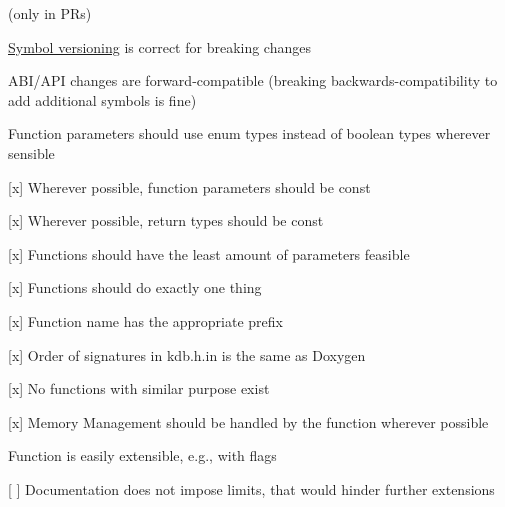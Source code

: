 {\ttfamily }

{\ttfamily  (only in P\+Rs)}

{\ttfamily 
\begin{DoxyItemize}
\item \hyperlink{doc_dev_symbol-versioning_md}{Symbol versioning} is correct for breaking changes
\item A\+B\+I/\+A\+PI changes are forward-\/compatible (breaking backwards-\/compatibility to add additional symbols is fine)
\end{DoxyItemize}}

{\ttfamily }

{\ttfamily 
\begin{DoxyItemize}
\item Function parameters should use enum types instead of boolean types wherever sensible
\item \mbox{[}x\mbox{]} Wherever possible, function parameters should be {\ttfamily const}
\item \mbox{[}x\mbox{]} Wherever possible, return types should be {\ttfamily const}
\item \mbox{[}x\mbox{]} Functions should have the least amount of parameters feasible
\end{DoxyItemize}}

{\ttfamily }

{\ttfamily 
\begin{DoxyItemize}
\item \mbox{[}x\mbox{]} Functions should do exactly one thing
\item \mbox{[}x\mbox{]} Function name has the appropriate prefix
\item \mbox{[}x\mbox{]} Order of signatures in kdb.\+h.\+in is the same as Doxygen
\item \mbox{[}x\mbox{]} No functions with similar purpose exist
\end{DoxyItemize}}

{\ttfamily }

{\ttfamily 
\begin{DoxyItemize}
\item \mbox{[}x\mbox{]} Memory Management should be handled by the function wherever possible
\end{DoxyItemize}}

{\ttfamily }

{\ttfamily 
\begin{DoxyItemize}
\item Function is easily extensible, e.\+g., with flags
\item \mbox{[} \mbox{]} Documentation does not impose limits, that would hinder further extensions
\end{DoxyItemize}}

